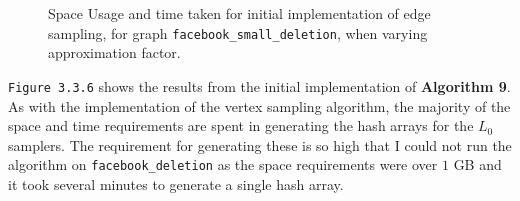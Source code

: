 \documentclass[11pt,twoside,a4paper]{report}
\begin{document}
\begin{figure}[H]
	\label{Figure 18}
	\caption{Space Usage and time taken for initial implementation of edge sampling, for graph \texttt{facebook\_small\_deletion}, when varying approximation factor.}
\end{figure}

\texttt{Figure 3.3.6} shows the results from the initial implementation of \textbf{Algorithm 9}. As with the implementation of the vertex sampling algorithm, the majority of the space and time requirements are spent in generating the hash arrays for the $L_0$ samplers. The requirement for generating these is so high that I could not run the algorithm on \texttt{facebook\_deletion} as the space requirements were over $1$ GB and it took several minutes to generate a single hash array.
\end{document}
